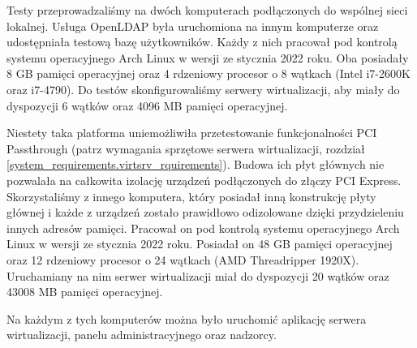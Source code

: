 \documentclass[../analiza-rozwiazania.tex]{subfiles}
\begin{document}
Testy przeprowadzaliśmy na dwóch komputerach podłączonych do wspólnej sieci lokalnej.
Usługa OpenLDAP była uruchomiona na innym komputerze oraz udostępniała testową bazę użytkowników.
Każdy z nich pracował pod kontrolą systemu operacyjnego Arch Linux w wersji ze stycznia 2022 roku.
Oba posiadały 8 GB pamięci operacyjnej oraz 4 rdzeniowy procesor o 8 wątkach (Intel i7-2600K oraz i7-4790).
Do testów skonfigurowaliśmy serwery wirtualizacji, aby miały do dyspozycji 6 wątków oraz 4096 MB pamięci operacyjnej.

Niestety taka platforma uniemożliwiła przetestowanie funkcjonalności PCI Passthrough (patrz wymagania sprzętowe serwera wirtualizacji, rozdział \ref{system_requirements.virtsrv_rquirements}).
Budowa ich płyt głównych nie pozwalała na całkowita izolację urządzeń podłączonych do złączy PCI Express.
Skorzystaliśmy z innego komputera, który posiadał inną konstrukcję płyty głównej i każde z urządzeń zostało prawidłowo odizolowane dzięki przydzieleniu innych adresów pamięci.
Pracował on pod kontrolą systemu operacyjnego Arch Linux w wersji ze stycznia 2022 roku.
Posiadał on 48 GB pamięci operacyjnej oraz 12 rdzeniowy procesor o 24 wątkach (AMD Threadripper 1920X).
Uruchamiany na nim serwer wirtualizacji miał do dyspozycji 20 wątków oraz 43008 MB pamięci operacyjnej.

Na każdym z tych komputerów można było uruchomić aplikację serwera wirtualizacji, panelu administracyjnego oraz nadzorcy.
\end{document}

